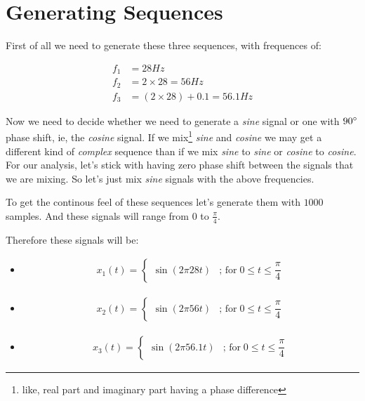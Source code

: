 \documentclass[../../course]{subfiles}
\begin{document}
\section{Generating Sequences} \label{sec:wrkGeneratingSeqcuences}

First of all we need to generate these three sequences, with frequences of:

\begin{align}
    f_{1} &= 28 \si{Hz}                         \label{eqn:freq1} \\
    f_{2} &= 2 \times 28         = 56   \si{Hz} \label{eqn:freq2} \\
    f_{3} &= (2 \times 28) + 0.1 = 56.1 \si{Hz} \label{eqn:freq3}
\end{align}

Now we need to decide whether we need to generate a \emph{sine} signal or one with
$90 \degree$ phase shift, ie, the \emph{cosine} signal. If we mix\footnote{like, real
part and imaginary part having a phase difference} \emph{sine} and \emph{cosine} we may
get a different kind of \emph{complex} sequence than if we mix \emph{sine} to \emph{sine}
or \emph{cosine} to \emph{cosine}. For our analysis, let's stick with having zero phase
shift between the signals that we are mixing. So let's just mix \emph{sine} signals with
the above frequencies.


To get the continous feel of these sequences let's generate them with $1000$ samples.
And these signals will range from $0$ to $\frac{\pi}{4}$.


Therefore these signals will be:

\begin{itemize} [label=]
    \item
        \begin{align}
            x_{1}(t) =
            \begin{cases}
                \sin(2 \pi 28 t) & \text{; for} \; 0 \le t \le \dfrac{\pi}{4}
            \end{cases}
        \end{align}

    \item
        \begin{align}
            x_{2}(t) =
            \begin{cases}
                \sin(2 \pi 56 t) & \text{; for} \; 0 \le t \le \dfrac{\pi}{4}
            \end{cases}
        \end{align}

    \item
        \begin{align}
            x_{3}(t) =
            \begin{cases}
                \sin(2 \pi 56.1 t) & \text{; for} \; 0 \le t \le \dfrac{\pi}{4}
            \end{cases}
        \end{align}

\end{itemize}
\end{document}
